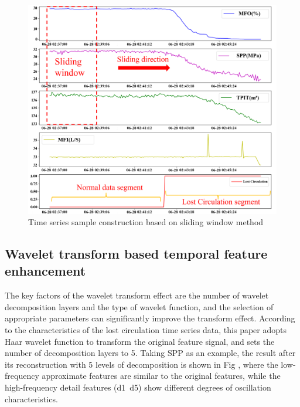\documentclass[journal,article,submit,pdftex,moreauthors]{Definitions/mdpi}
\begin{document}
\begin{figure}[h]
    \centering
    \includegraphics[width=0.75\linewidth]{图片/滑动窗口.png}
    \caption{Time series sample construction based on sliding window method}
    \label{fig:Time series sample construction based on sliding window method}
\end{figure}

\subsection{Wavelet transform based temporal feature enhancement}

The key factors of the wavelet transform effect are the number of wavelet decomposition layers and the type of wavelet function, and the selection of appropriate parameters can significantly improve the transform effect. According to the characteristics of the lost circulation time series data, this paper adopts Haar wavelet function to transform the original feature signal, and sets the number of decomposition layers to 5. Taking SPP as an example, the result after its reconstruction with 5 levels of decomposition is shown in Fig  \label{fig:Haar five-level wavelet decomposition reconstruction for SPPs}, where the low-frequency approximate features are similar to the original features, while the high-frequency detail features (d1~d5) show different degrees of oscillation characteristics.
\end{document}
